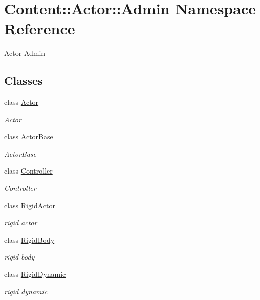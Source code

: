 \hypertarget{namespaceContent_1_1Actor_1_1Admin}{
\section{Content::Actor::Admin Namespace Reference}
\label{namespaceContent_1_1Actor_1_1Admin}
}


Actor Admin  
\subsection*{Classes}
\begin{DoxyCompactItemize}
\item 
class \hyperlink{classContent_1_1Actor_1_1Admin_1_1Actor}{Actor}
\begin{DoxyCompactList}\small\item\em Actor \item\end{DoxyCompactList}\item 
class \hyperlink{classContent_1_1Actor_1_1Admin_1_1ActorBase}{ActorBase}
\begin{DoxyCompactList}\small\item\em ActorBase \item\end{DoxyCompactList}\item 
class \hyperlink{classContent_1_1Actor_1_1Admin_1_1Controller}{Controller}
\begin{DoxyCompactList}\small\item\em Controller \item\end{DoxyCompactList}\item 
class \hyperlink{classContent_1_1Actor_1_1Admin_1_1RigidActor}{RigidActor}
\begin{DoxyCompactList}\small\item\em rigid actor \item\end{DoxyCompactList}\item 
class \hyperlink{classContent_1_1Actor_1_1Admin_1_1RigidBody}{RigidBody}
\begin{DoxyCompactList}\small\item\em rigid body \item\end{DoxyCompactList}\item 
class \hyperlink{classContent_1_1Actor_1_1Admin_1_1RigidDynamic}{RigidDynamic}
\begin{DoxyCompactList}\small\item\em rigid dynamic \item\end{DoxyCompactList}\item 

\end{DoxyCompactItemize}
